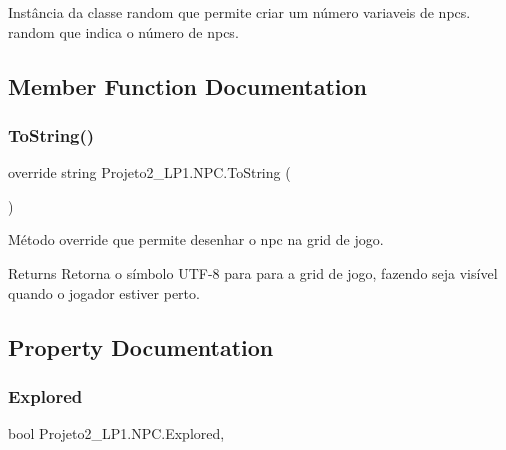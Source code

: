 Instância da classe random que permite criar um número variaveis de npcs. ~\newline
 random que indica o número de npcs. 

\subsection{Member Function Documentation}
\mbox{\label{class_projeto2___l_p1_1_1_n_p_c_ad23ebbb5686f2de8eecb7b53cc22ee31}} 
\subsubsection{\texorpdfstring{To\+String()}{ToString()}}
{\footnotesize\ttfamily override string Projeto2\+\_\+\+L\+P1.\+N\+P\+C.\+To\+String (\begin{DoxyParamCaption}{ }\end{DoxyParamCaption})\hspace{0.3cm}{\ttfamily [inline]}}



Método override que permite desenhar o npc na grid de jogo. 

\begin{DoxyReturn}{Returns}
Retorna o símbolo U\+T\+F-\/8 para para a grid de jogo, fazendo seja visível quando o jogador estiver perto. 
\end{DoxyReturn}


\subsection{Property Documentation}
\mbox{\label{class_projeto2___l_p1_1_1_n_p_c_a9838a4789d8c2e2e57f31a894ac81771}} 
\subsubsection{\texorpdfstring{Explored}{Explored}}
{\footnotesize\ttfamily bool Projeto2\+\_\+\+L\+P1.\+N\+P\+C.\+Explored\hspace{0.3cm}{\ttfamily [get]}, {\ttfamily [set]}}



